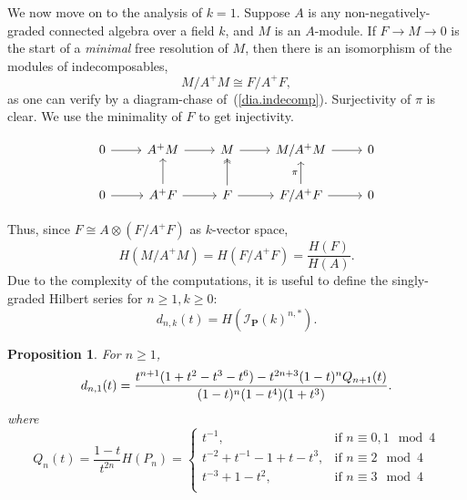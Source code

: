 \documentclass{amsart}
\theoremstyle{plain}
\newtheorem{proposition}[theorem]{Proposition}
\theoremstyle{definition}
\theoremstyle{remark}
\begin{document}
We now move on to the analysis of $k=1$.  
Suppose $A$ is any non-negatively-graded connected algebra over a
field $k$, and $M$ is an $A$-module.  If $F \to M \to 0$ is the start
of a {\it minimal} free resolution of $M$, then there is an
isomorphism of the modules of indecomposables,
\[
  M/A^+M \cong F/A^+F,
\]
as one can verify by a diagram-chase
of~(\ref{dia.indecomp}). Surjectivity of $\pi$ is clear.  We use the
minimality of $F$ to get injectivity.
\begin{center}
  \begin{equation}\label{dia.indecomp}
    \begin{tikzcd}
      0 \rar & A^+M \rar & M \rar & M/A^+M \rar & 0\\ 
      0 \rar & A^+F \uar \rar & F \rar \arrow[two heads]{u}
      & F/A^+F \rar \uar{\pi} & 0
    \end{tikzcd}
  \end{equation}
\end{center}
Thus, since $F \cong A \otimes (F/A^+F)$ as $k$-vector space,
\begin{equation}\label{eqn.Hilbert_series}
  H(M/A^+M) = H(F/A^+F) = \frac{H(F)}{H(A)}.
\end{equation}
Due to the complexity of the computations, it is useful to define the
singly-graded Hilbert series for $n \geq 1, k \geq 0$:
\[
  d_{n,k}(t) = H\left( \mathcal{I}_{\mathbf{P}}(k)^{n,*}\right).
\]
\begin{proposition}\label{prop.d_{n,1}(t)}
  For $n \geq 1$,
  \begin{equation}\label{eqn.d_{n,1}(t)}
    d_{n,1}(t) =
    \frac{t^{n+1}(1 + t^2 - t^3 - t^6) - t^{2n+3}(1-t)^nQ_{n+1}(t)}
         {(1-t)^n(1-t^4)(1+t^3)}.
  \end{equation}
  where
  \begin{equation}\label{eqn.Q_n(t)}
    Q_n(t) = \frac{1-t}{t^{2n}}H(P_n) = \left\{ \begin{array}{ll}
      t^{-1}, & \textrm{if $n \equiv 0, 1 \mod
        4$}\\ t^{-2}+t^{-1}-1+t-t^3, & \textrm{if $n \equiv 2 \mod
        4$}\\ t^{-3}+1-t^2, & \textrm{if $n \equiv 3 \mod 4$}\\
    \end{array}\right.
  \end{equation}
\end{proposition}
\end{document}
